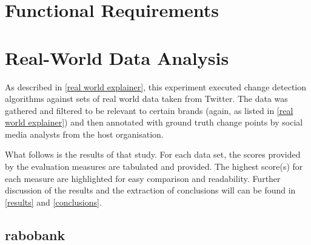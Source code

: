 \documentclass{uvamscse}	%
\begin{document}
\section{Functional Requirements}

\section{Real-World Data Analysis}

As described in \autoref{real world explainer}, this experiment executed change detection algorithms against sets of real world data taken from Twitter. The data was gathered and filtered to be relevant to certain brands (again, as listed in \autoref{real world explainer}) and then annotated with ground truth change points by social media analysts from the host organisation.

What follows is the results of that study. For each data set, the scores provided by the evaluation measures are tabulated and provided. The highest score(s) for each measure are highlighted for easy comparison and readability. Further discussion of the results and the extraction of conclusions will can be found in \autoref{results} and \autoref{conclusions}.

\subsection{rabobank}
\end{document}
